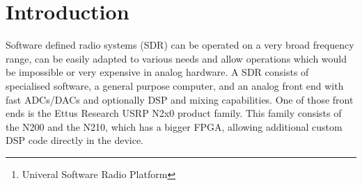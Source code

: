 \documentclass[12pt,a4paper,parskip=full]{scrartcl}
\begin{document}
\tableofcontents

\begin{abstract}
    The low cost Ettus Research USRP\footnote{Univeral Software Radio Platform} 
    combined with GNURadio enables implementing cheap and simple radio solutions.
    This allows rapid prototyping of new radio protocols, easier test setups for
    lab purposes and even reconstructing old analog communications hardware on a
    budget. Although Ettus Research provides schematics, source code, and documentation,
    there is no data available on the RF characteristics of the USRP devices.
\end{abstract}

\section{Introduction}
Software defined radio systems (SDR) can be operated on a very broad frequency range,
can be easily adapted to various needs and allow operations which would be
impossible or very expensive in analog hardware. A SDR consists of specialised
software, a general purpose computer, and an analog front end with fast
ADCs/DACs and optionally DSP and mixing capabilities. One of those front ends is
the Ettus Research USRP N2x0 product family. This family consists of the N200 and
the N210, which has a bigger FPGA, allowing additional custom DSP code directly
in the device.
\end{document}
